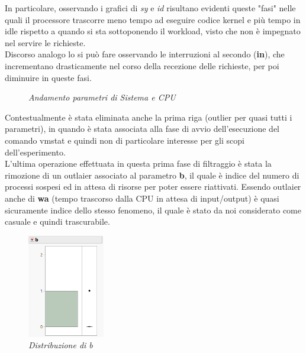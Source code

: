 In particolare, osservando i grafici di \textit{sy} e \textit{id} risultano evidenti queste "fasi" nelle quali il processore trascorre meno tempo ad eseguire codice kernel e più tempo in idle rispetto a quando si sta sottoponendo il workload, visto che non è impegnato nel servire le richieste.
\\
Discorso analogo lo si può fare osservando le interruzioni al secondo (\textbf{in}), che incrementano drasticamente nel corso della recezione delle richieste, per poi diminuire in queste fasi.
\begin{figure}[H]
	\centering   
	\caption{\textit{Andamento parametri di Sistema e CPU}}
\end{figure}
Contestualmente è stata eliminata anche la prima riga (outlier per quasi tutti i parametri), in quando è stata associata alla fase di avvio dell'esecuzione del comando vmstat e quindi non di particolare interesse per gli scopi dell'esperimento.
\\
L'ultima operazione effettuata in questa prima fase di filtraggio è stata la rimozione di un outlaier associato al parametro \textbf{b}, il quale è indice del numero di processi sospesi ed in attesa di risorse per poter essere riattivati.
Essendo outlaier anche di \textbf{wa} (tempo trascorso dalla CPU in attesa di input/output) è quasi sicuramente indice dello stesso fenomeno, il quale è stato da noi considerato come casuale e quindi trascurabile.
\begin{figure}[H]
	\centering
	\includegraphics[width=0.3\textwidth]{img/hw3/outlaier_b.png}
	\caption{\textit{Distribuzione di b}}
\end{figure}

